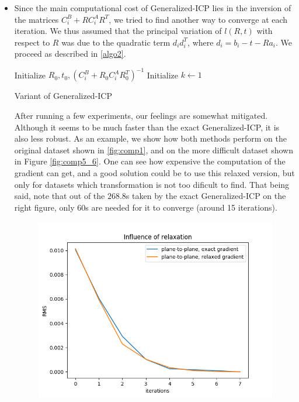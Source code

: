 \documentclass[11pt,letterpaper,leqno]{article}
\begin{document}
\begin{itemize}
    \item Since the main computational cost of Generalized-ICP lies in the inversion of the matrices $C_i^B + R C_i^A R^T$, we tried to find another way to converge at each iteration. We thus assumed that the principal variation of $l(R,t)$ with respect to $R$ was due to the quadratic term $d_i d_i^T$, where $d_i = b_i - t -Ra_i$. We proceed as described in \autoref{algo2}.
    \begin{algorithm}[H]
        \SetAlgoLined
         Initialize $R_0,t_0, (C_i^B + R_0 C_i^A R_0^T)^{-1}$\;
         Initialize $k \gets 1$\;
        \caption{Variant of Generalized-ICP}
        \label{algo2}
    \end{algorithm}
    After running a few experiments, our feelings are somewhat mitigated. Although it seems to be much faster than the exact Generalized-ICP, it is also less robust. As an example, we show how both methods perform on the original dataset shown in \ref{fig:comp1}, and on the more difficult dataset shown in Figure \ref{fig:comp5_6}. One can see how expensive the computation of the gradient can get, and a good solution could be to use this relaxed version, but only for datasets which transformation is not too dificult to find. That being said, note that out of the $268.8$s taken by the exact Generalized-ICP on the right figure, only $60$s are needed for it to converge (around 15 iterations).
    \begin{figure}[ht!]
        \centering
        \begin{minipage}{0.5\linewidth}
        \includegraphics[width=\linewidth]{img/comparison_relaxed_1.png}

\end{minipage}
\end{figure}
\end{itemize}
\end{document}
